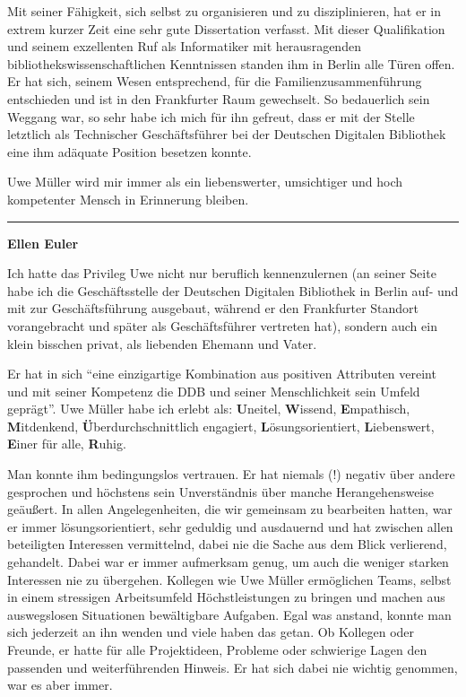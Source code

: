 \documentclass[a4paper,
fontsize=11pt,
oneside,
numbers=noperiodatend,
parskip=half-,
bibliography=totoc,
final
]{scrartcl}
\begin{document}
Mit seiner Fähigkeit, sich selbst zu organisieren und zu disziplinieren,
hat er in extrem kurzer Zeit eine sehr gute Dissertation verfasst. Mit
dieser Qualifikation und seinem exzellenten Ruf als Informatiker mit
herausragenden bibliothekswissenschaftlichen Kenntnissen standen ihm in
Berlin alle Türen offen. Er hat sich, seinem Wesen entsprechend, für die
Familienzusammenführung entschieden und ist in den Frankfurter Raum
gewechselt. So bedauerlich sein Weggang war, so sehr habe ich mich für
ihn gefreut, dass er mit der Stelle letztlich als Technischer
Geschäftsführer bei der Deutschen Digitalen Bibliothek eine ihm adäquate
Position besetzen konnte.

Uwe Müller wird mir immer als ein liebenswerter, umsichtiger und hoch
kompetenter Mensch in Erinnerung bleiben.

\begin{center}\rule{0.5\linewidth}{0.5pt}\end{center}

\textbf{Ellen Euler}

Ich hatte das Privileg Uwe nicht nur beruflich kennenzulernen (an seiner
Seite habe ich die Geschäftsstelle der Deutschen Digitalen Bibliothek in
Berlin auf- und mit zur Geschäftsführung ausgebaut, während er den
Frankfurter Standort vorangebracht und später als Geschäftsführer
vertreten hat), sondern auch ein klein bisschen privat, als liebenden
Ehemann und Vater.

Er hat in sich \enquote{eine einzigartige Kombination aus positiven
Attributen vereint und mit seiner Kompetenz die DDB und seiner
Menschlichkeit sein Umfeld geprägt}. Uwe Müller habe ich erlebt als:
\textbf{U}neitel, \textbf{W}issend, \textbf{E}mpathisch,
\textbf{M}itdenkend, \textbf{Ü}berdurchschnittlich engagiert,
\textbf{L}ösungsorientiert, \textbf{L}iebenswert, \textbf{E}iner für
alle, \textbf{R}uhig.

Man konnte ihm bedingungslos vertrauen. Er hat niemals (!) negativ über
andere gesprochen und höchstens sein Unverständnis über manche
Herangehensweise geäußert. In allen Angelegenheiten, die wir gemeinsam
zu bearbeiten hatten, war er immer lösungsorientiert, sehr geduldig und
ausdauernd und hat zwischen allen beteiligten Interessen vermittelnd,
dabei nie die Sache aus dem Blick verlierend, gehandelt. Dabei war er
immer aufmerksam genug, um auch die weniger starken Interessen nie zu
übergehen. Kollegen wie Uwe Müller ermöglichen Teams, selbst in einem
stressigen Arbeitsumfeld Höchstleistungen zu bringen und machen aus
auswegslosen Situationen bewältigbare Aufgaben. Egal was anstand, konnte
man sich jederzeit an ihn wenden und viele haben das getan. Ob Kollegen
oder Freunde, er hatte für alle Projektideen, Probleme oder schwierige
Lagen den passenden und weiterführenden Hinweis. Er hat sich dabei nie
wichtig genommen, war es aber immer.
\end{document}
